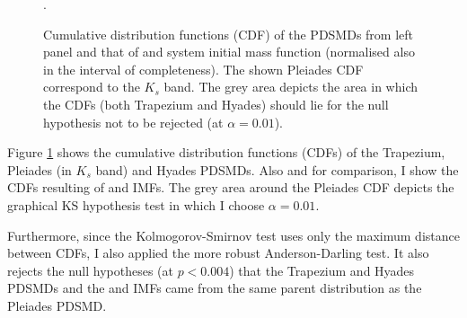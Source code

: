 \begin{figure}[htp]
\begin{center}
\caption{Cumulative distribution functions (CDF) of the PDSMDs from left panel and that of \citet{Chabrier2005} and \citet{Thies2007} system initial mass function (normalised also in the interval of completeness). The shown Pleiades CDF correspond to the $K_s$ band. The grey area depicts the area in which the CDFs (both Trapezium and Hyades) should lie for the null hypothesis not to be rejected (at $\alpha=0.01$).}
\label{fig:PDSMDtest}.
\end{center}
\end{figure}


Figure \ref{fig:PDSMDtest} shows the cumulative distribution functions (CDFs) of the Trapezium, Pleiades (in $K_s$ band) and Hyades PDSMDs. Also and for comparison, I show the CDFs resulting of \citet{Chabrier2005} and \citet{Thies2007} IMFs. The grey area around the Pleiades CDF depicts the graphical KS hypothesis test in which I choose $\alpha = 0.01$.

Furthermore, since the Kolmogorov-Smirnov test uses only the maximum distance between CDFs, I also applied the more robust Anderson-Darling test. It also rejects the null hypotheses (at $p < 0.004$) that the Trapezium and Hyades PDSMDs and the \citet{Chabrier2005} and \citet{Thies2007} IMFs came from the same parent distribution as the Pleiades PDSMD. 

